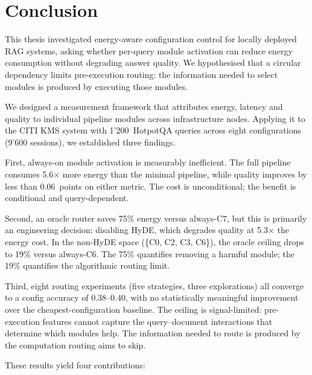 \newpage
\section{Conclusion}
\label{sec:conclusion}


This thesis investigated energy-aware configuration control for locally
deployed RAG systems, asking whether per-query module activation can
reduce energy consumption without degrading answer quality.  We
hypothesised that a circular dependency limits pre-execution routing:
the information needed to select modules is produced by executing those
modules.

We designed a measurement framework that attributes energy, latency and
quality to individual pipeline modules across infrastructure nodes.
Applying it to the CITI KMS system with 1{'}200~HotpotQA queries across
eight configurations (9{'}600 sessions), we established three findings.

First, always-on module activation is measurably inefficient.  The full
pipeline consumes 5.6$\times$ more energy than the minimal pipeline, while
quality improves by less than 0.06~points on either metric.  The cost is
unconditional; the benefit is conditional and query-dependent.

Second, an oracle router saves 75\% energy versus always-C7, but this
is primarily an engineering decision: disabling HyDE, which degrades
quality at 5.3$\times$ the energy cost.  In the non-HyDE space
(\{C0, C2, C3, C6\}), the oracle ceiling drops to 19\% versus
always-C6.  The 75\% quantifies removing a harmful module; the 19\%
quantifies the algorithmic routing limit.

Third, eight routing experiments (five strategies, three explorations)
all converge to a config accuracy of 0.38--0.40, with no statistically
meaningful improvement over the cheapest-configuration baseline.  The
ceiling is signal-limited: pre-execution features cannot capture the
query--document interactions that determine which modules help.  The
information needed to route is produced by the computation routing aims
to skip.

These results yield four contributions:

